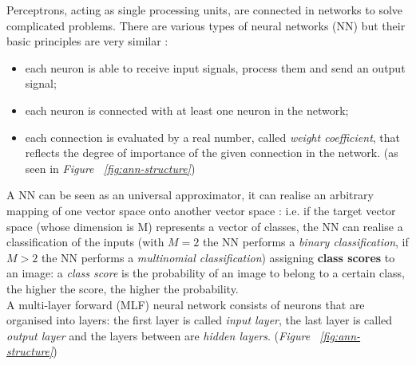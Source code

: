 \documentclass[../main.tex]{subfiles}
\begin{document}
Perceptrons, acting as single processing units, are connected in networks to solve complicated problems. There are various types of neural networks (NN) but their basic principles are very similar \cite{Svozil1997}: 
\begin{itemize}
	\item each neuron is able to receive input signals, process them and send an output signal;
	\item each neuron is connected with at least one neuron in the network; 
	\item each connection is evaluated by a real number, called \textit{weight coefficient}, that reflects the degree of importance of the given connection in the network. (as seen in \textit{Figure ~\ref{fig:ann-structure}})
\end{itemize}
A NN can be seen as an universal approximator, it can realise an arbitrary mapping of one vector space onto another vector space \cite{Svozil1997}: i.e. if the target vector space (whose dimension is M) represents a vector of classes, the NN can realise a classification of the inputs (with $M=2$ the NN performs a \textit{binary classification}, if $M>2$ the NN performs a \textit{multinomial classification}) assigning \textbf{class scores} to an image: a \textit{class score} is the probability of an image to belong to a certain class, the higher the score, the higher the probability.   \\ 
A multi-layer forward (MLF) neural network consists of neurons that are organised into layers: the first layer is called \textit{input layer}, the last layer is called \textit{output layer} and the layers between are \textit{hidden layers}. \cite{Svozil1997} (\textit{Figure ~\ref{fig:ann-structure}}) 

\vspace{5mm}
\end{document}
